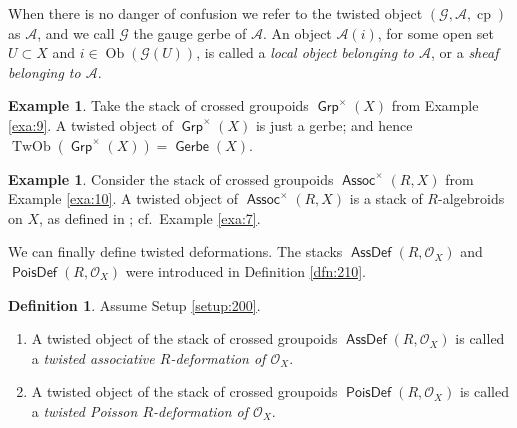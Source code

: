 \documentclass[a4paper, 10pt]{amsart}
\theoremstyle{definition}
\newtheorem{dfn}[equation]{Definition}
\newtheorem{exa}[equation]{Example}
\numberwithin{equation}{section}
\newcommand{\opn}{\operatorname}
\newcommand{\cat}[1]{\operatorname{\mathsf{#1}}}
\newcommand{\mcal}[1]{\mathcal{#1}}
\newcommand{\bsym}[1]{\boldsymbol{#1}}
\newcommand{\gerbe}[1]{\bsym{\mcal{#1}}}
\newcommand{\twocat}[1]{\operatorname{\bsym{\cat{#1}}}}
\begin{document}
When there is no danger of confusion we refer to the twisted object
$(\gerbe{G}, \gerbe{A}, \opn{cp})$ as $\gerbe{A}$, and we call
$\gerbe{G}$ the gauge gerbe of $\gerbe{A}$. 
An object $\gerbe{A}(i)$, for some open set $U \subset X$ and 
$i \in \opn{Ob} (\gerbe{G}(U))$, is called a {\em local object belonging
to $\gerbe{A}$}, or a {\em sheaf belonging to $\gerbe{A}$}.

\begin{exa} \label{exa:21}
Take the stack of crossed groupoids
$\twocat{Grp}^{\times}(X)$ from Example \ref{exa:9}. A twisted
object of $\twocat{Grp}^{\times}(X)$ is just a gerbe; and hence 
$\opn{TwOb}(\twocat{Grp}^{\times}(X)) = \twocat{Gerbe}(X)$.
\end{exa}

\begin{exa} \label{exa:tw.sh.101}
Consider the stack of crossed groupoids 
$\twocat{Assoc}^{\times}(R, X)$ from Example 
\ref{exa:10}. A twisted object of $\twocat{Assoc}^{\times}(R, X)$ is a stack of
$R$-algebroids on $X$, as defined in \cite{Ko2}; cf.\ Example \ref{exa:7}.
\end{exa}

We can finally define twisted deformations. 
The stacks $\twocat{AssDef}(R, \mcal{O}_X)$ and 
$\twocat{PoisDef}(R, \mcal{O}_X)$ were introduced in Definition \ref{dfn:210}. 

\begin{dfn} \label{dfn:24}
Assume Setup \ref{setup:200}. 
\begin{enumerate}
\item A twisted object of the stack of crossed groupoids
$\twocat{AssDef}(R, \mcal{O}_X)$ is called a {\em twisted
associative $R$-deformation of $\mcal{O}_X$}.
%
\item A twisted object of the  stack of crossed groupoids
$\twocat{PoisDef}(R, \mcal{O}_X)$ is called a {\em twisted
Poisson $R$-deformation of $\mcal{O}_X$}.
\end{enumerate}
\end{dfn}
\end{document}
